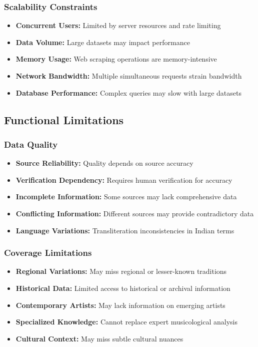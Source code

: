\documentclass[12pt,a4paper]{article}
\begin{document}
\subsubsection{Scalability Constraints}
\begin{itemize}
    \item \textbf{Concurrent Users:} Limited by server resources and rate limiting
    \item \textbf{Data Volume:} Large datasets may impact performance
    \item \textbf{Memory Usage:} Web scraping operations are memory-intensive
    \item \textbf{Network Bandwidth:} Multiple simultaneous requests strain bandwidth
    \item \textbf{Database Performance:} Complex queries may slow with large datasets
\end{itemize}

\subsection{Functional Limitations}

\subsubsection{Data Quality}
\begin{itemize}
    \item \textbf{Source Reliability:} Quality depends on source accuracy
    \item \textbf{Verification Dependency:} Requires human verification for accuracy
    \item \textbf{Incomplete Information:} Some sources may lack comprehensive data
    \item \textbf{Conflicting Information:} Different sources may provide contradictory data
    \item \textbf{Language Variations:} Transliteration inconsistencies in Indian terms
\end{itemize}

\subsubsection{Coverage Limitations}
\begin{itemize}
    \item \textbf{Regional Variations:} May miss regional or lesser-known traditions
    \item \textbf{Historical Data:} Limited access to historical or archival information
    \item \textbf{Contemporary Artists:} May lack information on emerging artists
    \item \textbf{Specialized Knowledge:} Cannot replace expert musicological analysis
    \item \textbf{Cultural Context:} May miss subtle cultural nuances
\end{itemize}
\end{document}
